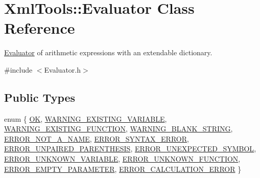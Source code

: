 \hypertarget{class_xml_tools_1_1_evaluator}{}\section{Xml\+Tools\+:\+:Evaluator Class Reference}
\label{class_xml_tools_1_1_evaluator}


\hyperlink{class_xml_tools_1_1_evaluator}{Evaluator} of arithmetic expressions with an extendable dictionary.  




{\ttfamily \#include $<$Evaluator.\+h$>$}

\subsection*{Public Types}
\begin{DoxyCompactItemize}
\item 
enum \{ \newline
\hyperlink{class_xml_tools_1_1_evaluator_a83556834c4fd68f4836782936cc29a6ba22108999c735ca50a4990bb9044ca164}{OK}, 
\hyperlink{class_xml_tools_1_1_evaluator_a83556834c4fd68f4836782936cc29a6badbd98a84392f1db7674537e1f46e82e6}{W\+A\+R\+N\+I\+N\+G\+\_\+\+E\+X\+I\+S\+T\+I\+N\+G\+\_\+\+V\+A\+R\+I\+A\+B\+LE}, 
\hyperlink{class_xml_tools_1_1_evaluator_a83556834c4fd68f4836782936cc29a6ba767ec14ec0d51b108af00f443450e7c1}{W\+A\+R\+N\+I\+N\+G\+\_\+\+E\+X\+I\+S\+T\+I\+N\+G\+\_\+\+F\+U\+N\+C\+T\+I\+ON}, 
\hyperlink{class_xml_tools_1_1_evaluator_a83556834c4fd68f4836782936cc29a6baa2b45925fd62e0af9c3261ddb2ee093e}{W\+A\+R\+N\+I\+N\+G\+\_\+\+B\+L\+A\+N\+K\+\_\+\+S\+T\+R\+I\+NG}, 
\newline
\hyperlink{class_xml_tools_1_1_evaluator_a83556834c4fd68f4836782936cc29a6ba621a09cd3a88b3d65599f643b37183e5}{E\+R\+R\+O\+R\+\_\+\+N\+O\+T\+\_\+\+A\+\_\+\+N\+A\+ME}, 
\hyperlink{class_xml_tools_1_1_evaluator_a83556834c4fd68f4836782936cc29a6babfe81983da70c8317f20aefecec1e07a}{E\+R\+R\+O\+R\+\_\+\+S\+Y\+N\+T\+A\+X\+\_\+\+E\+R\+R\+OR}, 
\hyperlink{class_xml_tools_1_1_evaluator_a83556834c4fd68f4836782936cc29a6ba4862b32a9f8e62b35180c7b922b169d0}{E\+R\+R\+O\+R\+\_\+\+U\+N\+P\+A\+I\+R\+E\+D\+\_\+\+P\+A\+R\+E\+N\+T\+H\+E\+S\+IS}, 
\hyperlink{class_xml_tools_1_1_evaluator_a83556834c4fd68f4836782936cc29a6bac18e89dc11c21d9d4bf970630fa9b073}{E\+R\+R\+O\+R\+\_\+\+U\+N\+E\+X\+P\+E\+C\+T\+E\+D\+\_\+\+S\+Y\+M\+B\+OL}, 
\newline
\hyperlink{class_xml_tools_1_1_evaluator_a83556834c4fd68f4836782936cc29a6baf55b8dd359ea08977cdb021be1895023}{E\+R\+R\+O\+R\+\_\+\+U\+N\+K\+N\+O\+W\+N\+\_\+\+V\+A\+R\+I\+A\+B\+LE}, 
\hyperlink{class_xml_tools_1_1_evaluator_a83556834c4fd68f4836782936cc29a6bac51246c5f76673dd1cb9bd5302403858}{E\+R\+R\+O\+R\+\_\+\+U\+N\+K\+N\+O\+W\+N\+\_\+\+F\+U\+N\+C\+T\+I\+ON}, 
\hyperlink{class_xml_tools_1_1_evaluator_a83556834c4fd68f4836782936cc29a6bad4291c0ebd5c6b036ec7ac842cda5b29}{E\+R\+R\+O\+R\+\_\+\+E\+M\+P\+T\+Y\+\_\+\+P\+A\+R\+A\+M\+E\+T\+ER}, 
\hyperlink{class_xml_tools_1_1_evaluator_a83556834c4fd68f4836782936cc29a6ba3414a1f123c2ee682d4700245c9b37e3}{E\+R\+R\+O\+R\+\_\+\+C\+A\+L\+C\+U\+L\+A\+T\+I\+O\+N\+\_\+\+E\+R\+R\+OR}
 \}
\end{DoxyCompactItemize}
